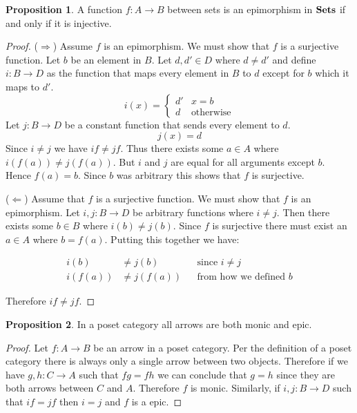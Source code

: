 \documentclass{article}
\theoremstyle{definition}
\newtheorem{proposition}{Proposition}
\newcommand{\arr}[3]{#1 : #2 \rightarrow #3}
\begin{document}
\begin{proposition}
  A function $\arr{f}{A}{B}$ between sets is an epimorphism in $\bf{Sets}$ if
  and only if it is injective.
\end{proposition}
\begin{proof}
  ($\Rightarrow$) Assume $f$ is an epimorphism. We must show that $f$ is a
  surjective function. Let $b$ be an element in $B$. Let $d, d' \in D$ where $d
  \neq d'$ and define $\arr{i}{B}{D}$ as the function that maps every element
  in $B$ to $d$ except for $b$ which it maps to $d'$.
  \[
    i(x) = \begin{cases}
      d' & x = b \\
      d & \text{otherwise}
    \end{cases}
  \]
  Let $\arr{j}{B}{D}$ be a constant function that sends every element to $d$.
  \[
    j(x) = d
  \]
  Since $i \neq j$ we have $if \neq jf$. Thus there exists some $a \in A$ where
  $i(f(a)) \neq j(f(a))$. But $i$ and $j$ are equal for all arguments except
  $b$. Hence $f(a) = b$. Since $b$ was arbitrary this shows that $f$ is
  surjective.

  ($\Leftarrow$) Assume that $f$ is a surjective function. We must show that $f$
  is an epimorphism. Let $\arr{i, j}{B}{D}$ be arbitrary functions where $i \neq
  j$. Then there exists some $b \in B$ where $i(b) \neq j(b)$. Since $f$ is
  surjective there must exist an $a \in A$ where $b = f(a)$. Putting this
  together we have:

  \begin{align*}
    i(b) &\neq j(b) && \text{since $i \neq j$} \\
    i(f(a)) &\neq j(f(a)) && \text{from how we defined $b$}
  \end{align*}

  Therefore $if \neq jf$.
\end{proof}

\begin{proposition}
  In a poset category all arrows are both monic and epic.
\end{proposition}
\begin{proof}
  Let $\arr{f}{A}{B}$ be an arrow in a poset category. Per the definition of a
  poset category there is always only a single arrow between two objects.
  Therefore if we have $\arr{g, h}{C}{A}$ such that $fg = fh$ we can conclude
  that $g = h$ since they are both arrows between $C$ and $A$. Therefore $f$ is
  monic. Similarly, if $\arr{i, j}{B}{D}$ such that $if = jf$ then $i = j$ and
  $f$ is a epic.
\end{proof}
\end{document}
